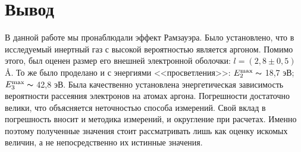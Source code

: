 	\newpage
	\section*{Вывод}
	
	В данной работе мы пронаблюдали эффект Рамзауэра. Было установлено, что в исследуемый инертный газ с высокой вероятностью является аргоном. Помимо этого, был оценен размер его внешней электронной оболочки: $l = (2,8 \pm 0,5)$ \AA. То же было проделано и с энергиями <<просветления>>: $E_2^\text{max} \thicksim $ 18,7 эВ; $E_3^\text{max} \thicksim $ 42,8 эВ. Была качественно установлена энергетическая зависимость вероятности рассеяния электронов на атомах аргона. Погрешности достаточно велики, что объясняется неточностью способа измерений. Свой вклад в погрешность вносит и методика измерений, и округление при расчетах. Именно поэтому полученные значения стоит рассматривать лишь как оценку искомых величин, а не непосредственно их истинные значения.
	
	
